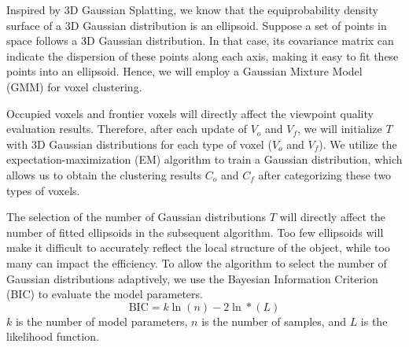 Inspired by 3D Gaussian Splatting\cite{kerbl20233d}, we know that the equiprobability density surface of a 3D Gaussian distribution is an ellipsoid. Suppose a set of points in space follows a 3D Gaussian distribution. In that case, its covariance matrix can indicate the dispersion of these points along each axis, making it easy to fit these points into an ellipsoid. Hence, we will employ a Gaussian Mixture Model (GMM) for voxel clustering.

Occupied voxels and frontier voxels will directly affect the viewpoint quality evaluation results.
Therefore, after each update of $V_o$ and $V_f$, we will initialize $T$ with 3D Gaussian distributions for each type of voxel ($V_o$ and $V_f$).
We utilize the expectation-maximization (EM) algorithm to train a Gaussian distribution, which allows us to obtain the clustering results $C_o$ and $C_f$ after categorizing these two types of voxels.

The selection of the number of Gaussian distributions $T$ will directly affect the number of fitted ellipsoids in the subsequent algorithm. 
Too few ellipsoids will make it difficult to accurately reflect the local structure of the object, while too many can impact the efficiency. 
To allow the algorithm to select the number of Gaussian distributions adaptively, we use the Bayesian Information Criterion (BIC)\cite{schwarz1978estimating} to evaluate the model parameters.
\begin{equation}
    \text{BIC} = k \ln (n) - 2 \ln *(L)
\end{equation}
$k$ is the number of model parameters, $n$ is the number of samples, and $L$ is the likelihood function.

